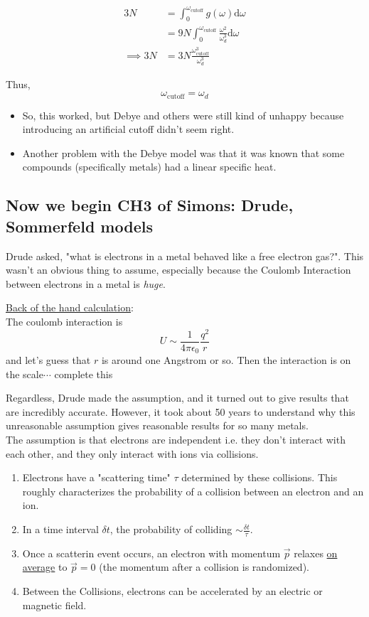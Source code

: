\documentclass[11pt]{article}
\begin{document}
\begin{align*}
  3N &= \int_{0}^{\omega_{\text{cutoff}}} g(\omega) \mathrm{d}\omega \\
  &= 9N \int_{0}^{\omega_{\text{cutoff}}} \frac{\omega^2}{\omega_d^3} \mathrm{d}\omega \\
  \implies 3N &= 3N \frac{\omega_{\text{cutoff}}^3}{\omega_d^3}
\end{align*}

Thus, \[ \boxed{\omega_{\text{cutoff}} = \omega_d} \]

\begin{itemize}
  \item So, this worked, but Debye and others were still kind of unhappy because introducing an artificial cutoff didn't seem right. 
  \item Another problem with the Debye model was that it was known that some compounds (specifically metals) had a linear specific heat.
\end{itemize}

\subsection*{Now we begin CH3 of Simons: Drude, Sommerfeld models}

Drude asked, "what is electrons in a metal behaved like a free electron gas?". This wasn't an obvious thing to assume, especially because the Coulomb Interaction between electrons in a metal is \textit{huge}.
\begin{bluebox}
  \underline{Back of the hand calculation}:
  \\
  The coulomb interaction is 
  \[ U \sim \frac{1}{4\pi \epsilon_0} \frac{q^2}{r} \] and let's guess that $r$ is around one Angstrom or so. Then the interaction is on the scale$\cdots$ complete this
\end{bluebox}
Regardless, Drude made the assumption, and it turned out to give results that are incredibly accurate. However, it took about 50 years to understand why this unreasonable assumption gives reasonable results for so many metals.
\\
The assumption is that electrons are independent i.e. they don't interact with each other, and they only interact with ions via collisions.
\begin{enumerate}[label=(\alph*)]
  \item Electrons have a "scattering time" $\tau$ determined by these collisions. This roughly characterizes the probability of a collision between an electron and an ion.
  \item In a time interval $\delta t$, the probability of colliding $\sim \frac{\delta t}{\tau}$.
  \item Once a scatterin event occurs, an electron with momentum $\vec{p}$ relaxes \underline{on average} to $\vec{p} = 0$ (the momentum after a collision is randomized).
  \item Between the Collisions, electrons can be accelerated by an electric or magnetic field.
\end{enumerate}
\end{document}

